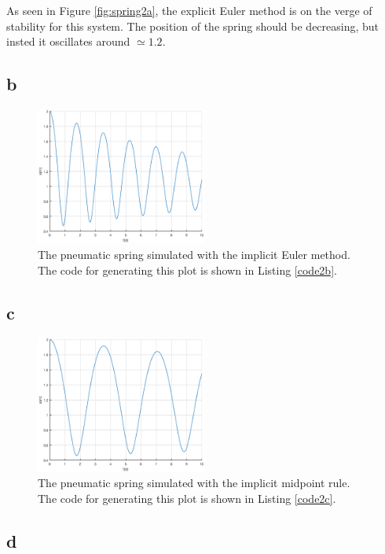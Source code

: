 \documentclass{article}
\begin{document}
As seen in Figure \ref{fig:spring2a}, the explicit Euler method is on the verge of stability for this system. The position of the spring should be decreasing, but insted it oscillates around $\simeq 1.2$.

\subsection{b}

\begin{figure}[!ht]\label{fig:spring2b}
	\centering
	\includegraphics[width = 0.5\textwidth]{ModSim_ex4_2b}
    \caption{The pneumatic spring simulated with the implicit Euler method. The code for generating this plot is shown in Listing \ref{code2b}.}
\end{figure}

\subsection{c}

\begin{figure}[!ht]\label{fig:spring2c}
	\centering
	\includegraphics[width = 0.5\textwidth]{ModSim_ex4_2c}
    \caption{The pneumatic spring simulated with the implicit midpoint rule. The code for generating this plot is shown in Listing \ref{code2c}.}
\end{figure}

\subsection{d}
\end{document}
